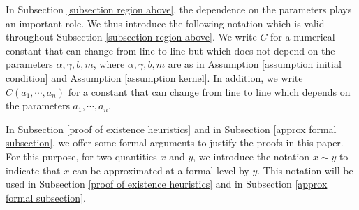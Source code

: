 \documentclass[11pt]{article}
\numberwithin{equation}{section}
\begin{document}
In Subsection \ref{subsection region above}, the dependence on the parameters plays an important role. We thus introduce the following notation which is valid throughout Subsection \ref{subsection region above}. We write $C$ for a numerical constant that can change from line to line but which does not depend on the parameters $\alpha,\gamma,b,m$, where $\alpha,\gamma,b,m$ are as in Assumption \ref{assumption initial condition} and Assumption \ref{assumption kernel}. In addition, we write $C(a_{1},\cdots,a_{n})$ for a constant that can change from line to line which depends on the parameters $a_{1},\cdots,a_{n}$.


In Subsection \ref{proof of existence heuristics} and in Subsection \ref{approx formal subsection}, we offer some formal arguments to justify the proofs in this paper. For this purpose, for two quantities $x$ and $y$, we introduce the notation $x \sim y$  to indicate that $x$ can be approximated at a formal level by $y$. This notation will be used in Subsection \ref{proof of existence heuristics} and in Subsection \ref{approx formal subsection}.
\end{document}
